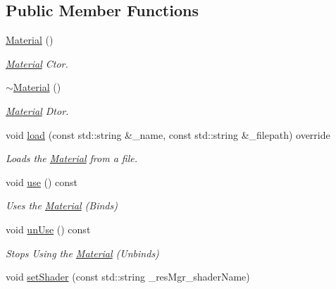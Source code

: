 \subsection*{Public Member Functions}
\begin{DoxyCompactItemize}
\item 
\hyperlink{class_cookie_eng_1_1_resources_1_1_material_a20a77072223e5948a5842aa71cf04eff}{Material} ()
\begin{DoxyCompactList}\small\item\em \hyperlink{class_cookie_eng_1_1_resources_1_1_material}{Material} Ctor. \end{DoxyCompactList}\item 
\hyperlink{class_cookie_eng_1_1_resources_1_1_material_aa2fb7a1c6a22e6e3a4271ad4aca8f0a6}{$\sim$\+Material} ()
\begin{DoxyCompactList}\small\item\em \hyperlink{class_cookie_eng_1_1_resources_1_1_material}{Material} Dtor. \end{DoxyCompactList}\item 
void \hyperlink{class_cookie_eng_1_1_resources_1_1_material_a5d14ee55b9ce265cd557b85efd0e5722}{load} (const std\+::string \&\+\_\+name, const std\+::string \&\+\_\+filepath) override
\begin{DoxyCompactList}\small\item\em Loads the \hyperlink{class_cookie_eng_1_1_resources_1_1_material}{Material} from a file. \end{DoxyCompactList}\item 
void \hyperlink{class_cookie_eng_1_1_resources_1_1_material_aeafea03fdfdaef5fb7be763e8948f416}{use} () const
\begin{DoxyCompactList}\small\item\em Uses the \hyperlink{class_cookie_eng_1_1_resources_1_1_material}{Material} (Binds) \end{DoxyCompactList}\item 
void \hyperlink{class_cookie_eng_1_1_resources_1_1_material_a7316b5a9dcc1b71b5090b5d54c7ac222}{un\+Use} () const
\begin{DoxyCompactList}\small\item\em Stops Using the \hyperlink{class_cookie_eng_1_1_resources_1_1_material}{Material} (Unbinds) \end{DoxyCompactList}\item 
void \hyperlink{class_cookie_eng_1_1_resources_1_1_material_a55455e741fb79ffd11be29967097709c}{set\+Shader} (const std\+::string \+\_\+res\+Mgr\+\_\+shader\+Name)

\end{DoxyCompactItemize}
